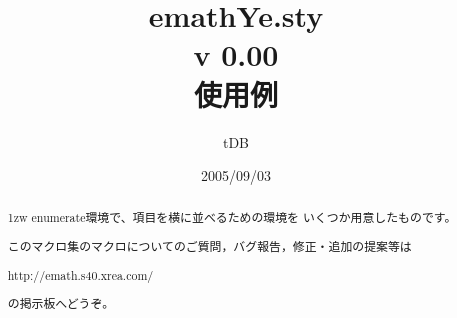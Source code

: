 \documentclass[a4j]{jarticle}
\title{\textsf{emathYe.sty} \\{\normalsize v 0.00}\\
使用例}
\author{tDB}
\date{2005/09/03}
\begin{document}
\maketitle\thispagestyle{empty}
\begin{abstract}%
\parindent1zw%
\textsf{enumerate}環境で、項目を横に並べるための環境を
いくつか用意したものです。

このマクロ集のマクロについてのご質問，バグ報告，修正・追加の提案等は
\begin{center}
http://emath.s40.xrea.com/
\end{center}
の掲示板へどうぞ。
\end{abstract}

\tableofcontents

\pagebreak
{}
\pagebreak

\def\bunsuu{\displaystyle\frac}%

\def\labelenumii{(\arabic{enumii})}
\end{document}
